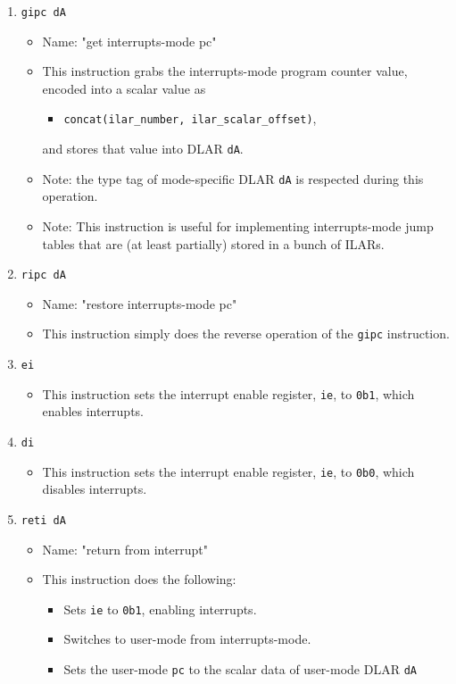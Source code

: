 \documentclass{article}
\begin{document}
\begin{itemize}
\begin{enumerate}
			\item \texttt{gipc dA}
				\begin{itemize}
				\item Name:  "get interrupts-mode pc"
				\item This instruction grabs the interrupts-mode program
					counter value, encoded into a scalar value as
					\begin{itemize}
					\item \texttt{concat(ilar\_number, 
						ilar\_scalar\_offset)},
					\end{itemize}
					and stores that value into DLAR \texttt{dA}.
				\item Note:  the type tag of mode-specific DLAR \texttt{dA}
					is respected during this operation.
				\item Note:  This instruction is useful for implementing
					interrupts-mode jump tables that are (at least
					partially) stored in a bunch of ILARs.
				\end{itemize}
			\item \texttt{ripc dA}
				\begin{itemize}
				\item Name:  "restore interrupts-mode pc"
				\item This instruction simply does the reverse operation of
					the \texttt{gipc} instruction.
				\end{itemize}


			\item \texttt{ei}
				\begin{itemize}
				\item This instruction sets the interrupt enable register,
					\texttt{ie}, to \texttt{0b1}, which enables interrupts.
				\end{itemize}
			\item \texttt{di}
				\begin{itemize}
				\item This instruction sets the interrupt enable register,
					\texttt{ie}, to \texttt{0b0}, which disables
					interrupts.
				\end{itemize}

			\item \texttt{reti dA}
				\begin{itemize}
				\item Name:  "return from interrupt"
				\item This instruction does the following:
					\begin{itemize}
					\item Sets \texttt{ie} to \texttt{0b1}, enabling
						interrupts.
					\item Switches to user-mode from interrupts-mode.
					\item Sets the user-mode \texttt{pc} to the scalar data
						of user-mode DLAR \texttt{dA}
					\end{itemize}
				\end{itemize}


\end{enumerate}
\end{itemize}
\end{document}
